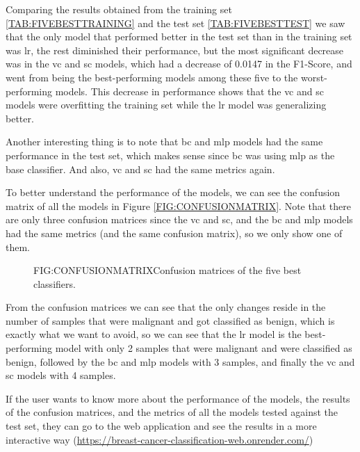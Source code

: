 Comparing the results obtained from the training set \ref{TAB:FIVEBESTTRAINING} and the test set \ref{TAB:FIVEBESTTEST} we saw that the only model that performed better in the test set than in the training set was \acl{lr}, the rest diminished their performance, but the most significant decrease was in the \acl{vc} and \acl{sc} models, which had a decrease of 0.0147 in the F1-Score, and went from being the best-performing models among these five to the worst-performing models. This decrease in performance shows that the \acl{vc} and \acl{sc} models were overfitting the training set while the \acl{lr} model was generalizing better. 

Another interesting thing is to note that \ac{bc} and \ac{mlp} models had the same performance in the test set, which makes sense since \ac{bc} was using \ac{mlp} as the base classifier. And also, \ac{vc} and \ac{sc} had the same metrics again.

To better understand the performance of the models, we can see the confusion matrix of all the models in Figure \ref{FIG:CONFUSIONMATRIX}. Note that there are only three confusion matrices since the \ac{vc} and \ac{sc}, and the \ac{bc} and \ac{mlp} models had the same metrics (and the same confusion matrix), so we only show one of them.

\begin{figure}[Confusion Matrix]{FIG:CONFUSIONMATRIX}{Confusion matrices of the five best classifiers.}
    \begin{adjustbox}{width=1\textwidth,height=\textheight,keepaspectratio}
\end{adjustbox}
\end{figure}

From the confusion matrices we can see that the only changes reside in the number of samples that were malignant and got classified as benign, which is exactly what we want to avoid, so we can see that the \ac{lr} model is the best-performing model with only 2 samples that were malignant and were classified as benign, followed by the \ac{bc} and \ac{mlp} models with 3 samples, and finally the \ac{vc} and \ac{sc} models with 4 samples.

If the user wants to know more about the performance of the models, the results of the confusion matrices, and the metrics of all the models tested against the test set, they can go to the web application and see the results in a more interactive way (\href{https://breast-cancer-classification-web.onrender.com/}{https://breast-cancer-classification-web.onrender.com/})